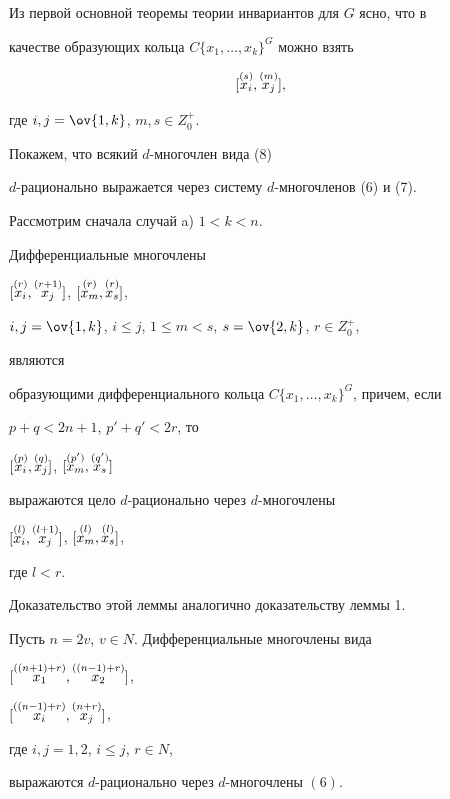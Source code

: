 Из первой основной теоремы теории инвариантов для $G$ ясно, что в 


качестве образующих кольца $C\{x_1,\dotsc,x_k\}^G$ можно взять


\begin{equation}


[\up{(s)}{x_i},\up{(m)}{x_j}],


\end{equation}


где $i,j=\ov{1,k}$, $m,s\in Z^+_0$.


Покажем, что всякий $d$-многочлен вида (8) 


$d$-рационально выражается через систему $d$-многочленов (6) и (7).





Рассмотрим сначала случай a) $1<k<n$.





\begin{lem}


Дифференциальные многочлены


$[\overset{(r)}{x_i}{},\overset{(r+1)}{x_j}{}]$, $[\overset{(r)}{x_m}{},\overset{(r)}{x_s}{}]$,


$i,j=\ov{1,k}$, $i\le j$, $1\le m<s$, $s=\ov{2,k}$, $r\in Z^+_0$,


являются


образующими дифференциального кольца $C\{x_1,\dotsc,x_k\}^G$, причем, если 


$p+q<2n+1$, $p'+q'<2r$, то


$[\overset{(p)}{x_i}{},\overset{(q)}{x_j}{}]$, $[\overset{(p')}{x_m}{},\overset{(q')}{x_s}{}]$


выражаются цело $d$-рационально через $d$-многочлены


$[\overset{(l)}{x_i}{},\overset{(l+1)}{x_j}{}]$, $[\overset{(l)}{x_m}{},\overset{(l)}{x_s}{}]$,


где $l<r$.


\end{lem}





Доказательство этой леммы аналогично доказательству леммы 1. 





\begin{lem}


Пусть $n=2v$, $v\in N$. Дифференциальные многочлены вида


$[\overset{((n+1)+r)}{x_1}{},\overset{((n-1)+r)}{x_2}{}]$,


$[\overset{((n-1)+r)}{x_i}{},\overset{(n+r)}{x_j}{}]$,


где $i,j=1,2$, $i\le j$, $r\in N$,


выражаются $d$-рационально через $d$-многочлены $(6)$. 


\end{lem}





